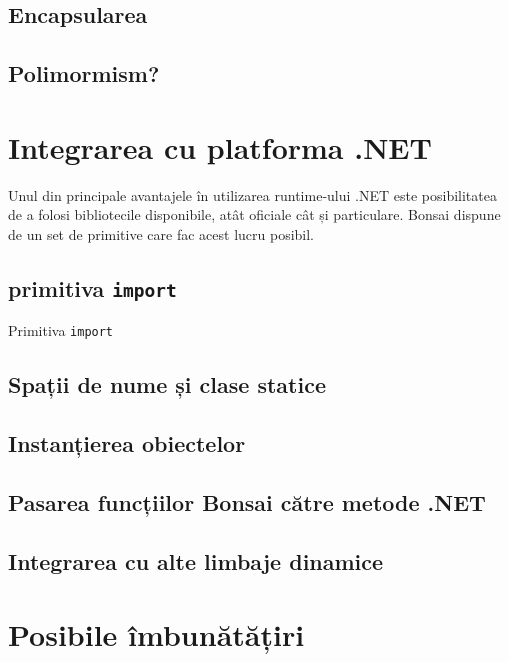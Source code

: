 \documentclass[12pt,a4paper]{memoir}
\begin{document}
\section{Encapsularea}


\section{Polimormism?}


\chapter{Integrarea cu platforma .NET}

Unul din principale avantajele în utilizarea runtime-ului .NET este posibilitatea de a folosi bibliotecile disponibile, atât oficiale cât și particulare. Bonsai dispune de un set de primitive care fac acest lucru posibil.

\section{primitiva \texttt{import}}

Primitiva \texttt{import}

\section{Spații de nume și clase statice}

\section{Instanțierea obiectelor}

\section{Pasarea funcțiilor Bonsai către metode .NET}

\section{Integrarea cu alte limbaje dinamice}

\chapter{Posibile îmbunătățiri}
\end{document}
